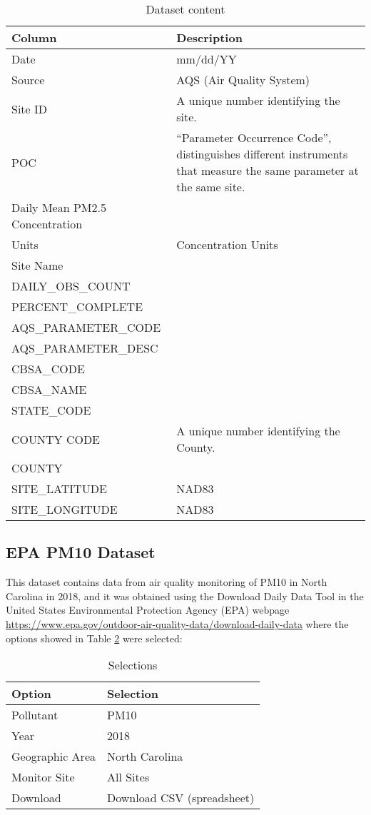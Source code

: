 \documentclass[12pt,]{article}
\begin{document}
\begin{table}[ht]
\centering
\begin{tabular}{p{2.5in}p{3.5in}}
  \hline
Column & Description \\ 
  \hline
Date & mm/dd/YY \\ 
  Source & AQS (Air Quality System) \\ 
  Site ID & A unique number identifying the site. \\ 
  POC & “Parameter Occurrence Code”, distinguishes different instruments that measure the same parameter at the same site. \\ 
  Daily Mean PM2.5 Concentration &  \\ 
  Units & Concentration Units \\ 
  Site Name &  \\ 
  DAILY\_OBS\_COUNT &  \\ 
  PERCENT\_COMPLETE &  \\ 
  AQS\_PARAMETER\_CODE &  \\ 
  AQS\_PARAMETER\_DESC &  \\ 
  CBSA\_CODE &  \\ 
  CBSA\_NAME &  \\ 
  STATE\_CODE &  \\ 
  COUNTY CODE & A unique number identifying the County. \\ 
  COUNTY &  \\ 
  SITE\_LATITUDE & NAD83 \\ 
  SITE\_LONGITUDE & NAD83 \\ 
   \hline
\end{tabular}
\caption{Dataset content} 
\label{tab:tab3}
\end{table}

\subsection{EPA PM10 Dataset}\label{epa-pm10-dataset}

This dataset contains data from air quality monitoring of PM10 in North
Carolina in 2018, and it was obtained using the Download Daily Data Tool
in the United States Environmental Protection Agency (EPA) webpage
\url{https://www.epa.gov/outdoor-air-quality-data/download-daily-data}
where the options showed in Table \ref{tab:tab4} were selected:

\begin{table}[ht]
\centering
\begin{tabular}{ll}
  \hline
Option & Selection \\ 
  \hline
Pollutant & PM10 \\ 
  Year & 2018 \\ 
  Geographic Area & North Carolina \\ 
  Monitor Site & All Sites \\ 
  Download & Download CSV (spreadsheet) \\ 
   \hline
\end{tabular}
\caption{Selections} 
\label{tab:tab4}
\end{table}
\end{document}
